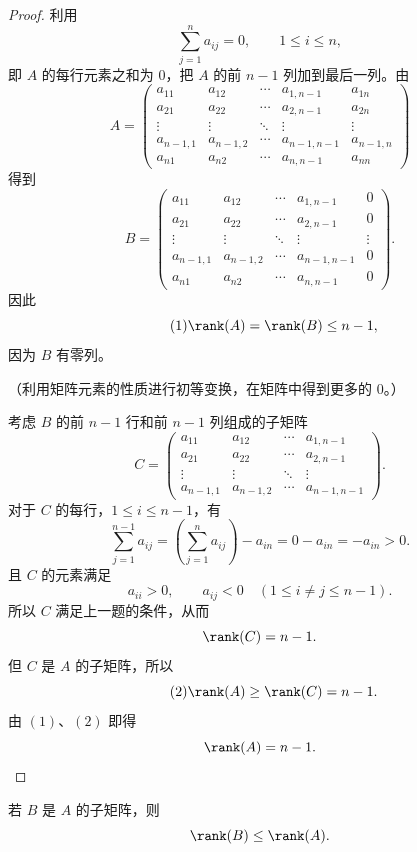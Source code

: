 \begin{proof}
	利用
	\[
	\sum_{j=1}^n a_{ij}=0,
	\qquad 1\leq i\leq n,
	\]
	即 $A$ 的每行元素之和为 $0$，把 $A$ 的前 $n-1$ 列加到最后一列。由
	\[
	A=
	\begin{pmatrix}
		a_{11}&a_{12}&\cdots&a_{1,n-1}&a_{1n}\\
		a_{21}&a_{22}&\cdots&a_{2,n-1}&a_{2n}\\
		\vdots&\vdots&\ddots&\vdots&\vdots\\
		a_{n-1,1}&a_{n-1,2}&\cdots&a_{n-1,n-1}&a_{n-1,n}\\
		a_{n1}&a_{n2}&\cdots&a_{n,n-1}&a_{nn}
	\end{pmatrix}
	\]
	得到
	\[
	B=
	\begin{pmatrix}
		a_{11}&a_{12}&\cdots&a_{1,n-1}&0\\
		a_{21}&a_{22}&\cdots&a_{2,n-1}&0\\
		\vdots&\vdots&\ddots&\vdots&\vdots\\
		a_{n-1,1}&a_{n-1,2}&\cdots&a_{n-1,n-1}&0\\
		a_{n1}&a_{n2}&\cdots&a_{n,n-1}&0
	\end{pmatrix}.
	\]
	因此
	\begin{equation}\tag{1}
		\rank(A)=\rank(B)\leq n-1,
	\end{equation}
	因为 $B$ 有零列。
	
	（利用矩阵元素的性质进行初等变换，在矩阵中得到更多的 $0$。）
	
	考虑 $B$ 的前 $n-1$ 行和前 $n-1$ 列组成的子矩阵
	\[
	C=
	\begin{pmatrix}
		a_{11}&a_{12}&\cdots&a_{1,n-1}\\
		a_{21}&a_{22}&\cdots&a_{2,n-1}\\
		\vdots&\vdots&\ddots&\vdots\\
		a_{n-1,1}&a_{n-1,2}&\cdots&a_{n-1,n-1}
	\end{pmatrix}.
	\]
	对于 $C$ 的每行，$1\leq i\leq n-1$，有
	\[
	\sum_{j=1}^{n-1}a_{ij}
	=\left(\sum_{j=1}^n a_{ij}\right)-a_{in}
	=0-a_{in}=-a_{in}>0.
	\]
	且 $C$ 的元素满足
	\[
	a_{ii}>0,
	\qquad
	a_{ij}<0\quad(1\leq i\neq j\leq n-1).
	\]
	所以 $C$ 满足上一题的条件，从而
	\[
	\rank(C)=n-1.
	\]
	但 $C$ 是 $A$ 的子矩阵，所以
	\begin{equation}\tag{2}
		\rank(A)\geq\rank(C)=n-1.
	\end{equation}
	由 $(1)$、$(2)$ 即得
	\[
	\rank(A)=n-1.
	\]
\end{proof}

\begin{proposition}
	若 $B$ 是 $A$ 的子矩阵，则
	\[
	\rank(B)\leq\rank(A).
	\]
\end{proposition}

